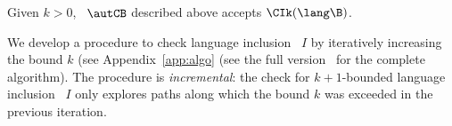 \begin{proposition}
Given $k>0$, \nfa~$\autCB$ described above accepts $\CIk(\lang \B)$.
\end{proposition}


We develop a procedure to check 
language inclusion \upto~$I$ by iteratively increasing the bound $k$
\ifappendix
(see Appendix~\ref{app:algo}
\else
(see the full version~\cite{fullversion}
\fi
for the complete algorithm). 
The procedure is {\em incremental}: the check for $k+1$-bounded language
inclusion \upto~$I$ only explores paths along which the bound $k$
was exceeded in the previous iteration. 






